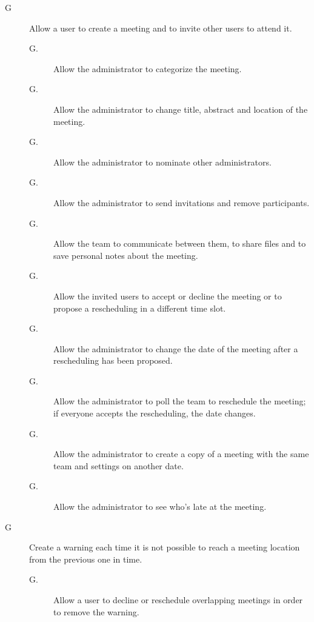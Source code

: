 \begin{description}
\item[G\thecount] Allow a user to create a meeting and to invite other users to attend it.
\begin{description}
\item[G\thecount.\thecountin] Allow the administrator to categorize the meeting.
\item[G\thecount.\thecountin] Allow the administrator to change title, abstract and location of the meeting.
\item[G\thecount.\thecountin] Allow the administrator to nominate other administrators.
\item[G\thecount.\thecountin] Allow the administrator to send invitations and remove participants.
\item[G\thecount.\thecountin] Allow the team to communicate between them, to share files and to save personal notes about the meeting.
\item[G\thecount.\thecountin] Allow the invited users to accept or decline the meeting or to propose a rescheduling in a different time slot.
\item[G\thecount.\thecountin] Allow the administrator to change the date of the meeting after a rescheduling has been proposed.
\item[G\thecount.\thecountin] Allow the administrator to poll the team to reschedule the meeting; if everyone accepts the rescheduling, the date changes.
\item[G\thecount.\thecountin] Allow the administrator to create a copy of a meeting with the same team and settings on another date.
\item[G\thecount.\thecountin] Allow the administrator to see who’s late at the meeting.
\end{description}

\setcounter{countin}{1}

\item[G\thecount] Create a warning each time it is not possible to reach a meeting location from the previous one in time.
\begin{description}
\item[G\thecount.\thecountin] Allow a user to decline or reschedule overlapping meetings in order to remove the warning.
\end{description}


\end{description}
